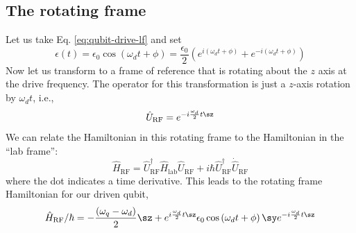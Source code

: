 \subsection{The rotating frame}
\label{sec:rotatingframe}
Let us take Eq. \ref{eq:qubit-drive-lf} and set 
\begin{equation}
    \epsilon(t) = \epsilon_0 \cos \left(\omega_d t + \phi\right) = \frac{\epsilon_0}{2}\left(e^{i\left(\omega_d t + \phi\right)}+e^{-i\left(\omega_d t + \phi\right)}\right)
\end{equation}
Now let us transform to a frame of reference that is rotating about the $z$ axis at the drive frequency. The operator for this transformation is just a $z$-axis rotation by $\omega_d t$, i.e., 
\begin{equation}
    \hat{U}_\mathrm{RF} = e^{-i\frac{\omega_d}{2}t\sz} 
\end{equation}
We can relate the Hamiltonian in this rotating frame to the Hamiltonian in the ``lab frame'':
\begin{equation}
\label{eq:Hrfgeneral}
    \hat{H}_\mathrm{RF} = \hat{U}_\mathrm{RF}^\dag \hat{H}_\mathrm{lab} \hat{U}_\mathrm{RF} + i \hbar \hat{U}_\mathrm{RF}^\dag \dot{\hat{U}}_\mathrm{RF}
\end{equation}
where the dot indicates a time derivative. This leads to the rotating frame Hamiltonian for our driven qubit,
\begin{equation}
    \label{eq:Hrfdrivenqubit}
    \hat{H}_\mathrm{RF}/\hbar = -\frac{(\omega_q-\omega_d)}{2}\sz + e^{i\frac{\omega_d}{2}t\sz} \epsilon_0 \cos\left(\omega_d t + \phi\right) \sy e^{-i\frac{\omega_d}{2}t\sz} 
\end{equation}

